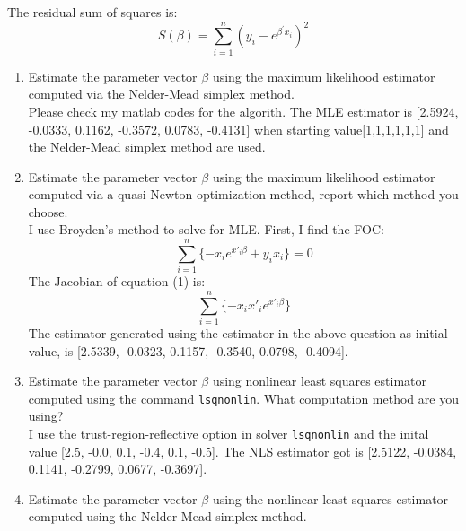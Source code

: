 \documentclass{article}
\begin{document}
The residual sum of squares is:%
\[
S\left( \beta \right) =\sum\limits_{i=1}^{n}\left( y_{i}-e^{\beta ^{\prime
}x_{i}}\right) ^{2} 
\]

\begin{enumerate}
\item Estimate the parameter vector $\beta$ using the maximum likelihood estimator computed via  
the Nelder-Mead simplex method. \\[2em]

Please check my matlab codes for the algorith. The MLE estimator is  [2.5924, -0.0333, 0.1162, -0.3572, 0.0783, -0.4131] when starting value[1,1,1,1,1,1] and the Nelder-Mead simplex method are used. \\[3em]






\item Estimate the parameter vector $\beta$ using the maximum likelihood estimator computed via  
a quasi-Newton optimization method, report which method you choose.\\[2em]

I use Broyden's method to solve for MLE. First, I find the FOC: 
\begin{equation}
\sum_{i=1}^n  \lbrace -x_i e^{x'_i\beta}+y_i x_i \rbrace=0
\end{equation}
The Jacobian of equation (1) is: $$\sum_{i=1}^n  \lbrace -x_i x'_ie^{x'_i\beta} \rbrace $$
The estimator generated using the estimator in the above question as initial value, is [2.5339, -0.0323, 0.1157, -0.3540, 0.0798, -0.4094].    \\[3em]


 

\item Estimate the parameter vector $\beta$ using nonlinear least squares estimator computed using
the command {\tt lsqnonlin}. What computation method are you using? \\[2em]

I use the trust-region-reflective option in solver {\tt lsqnonlin} and the inital value [2.5, -0.0, 0.1, -0.4, 0.1, -0.5]. The NLS estimator got is [2.5122, -0.0384, 0.1141, -0.2799,  0.0677, -0.3697]. \\[3em]


\item Estimate the parameter vector $\beta$ using the nonlinear least squares estimator computed using 
the Nelder-Mead simplex method. \\[2em]


\end{enumerate}
\end{document}
